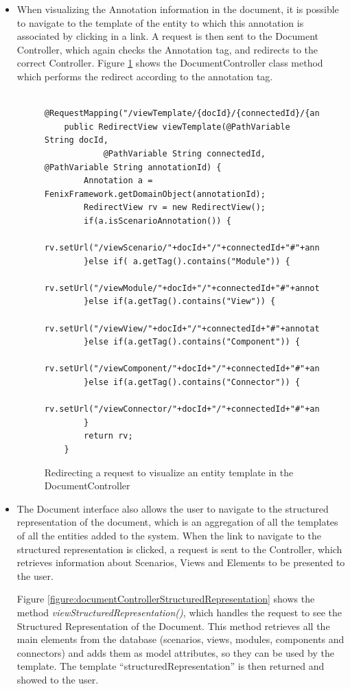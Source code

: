 \begin{itemize}
\item When visualizing the Annotation information in the document, it is possible to navigate to the template of the entity to which this annotation is associated by clicking in a link. A request is then sent to the Document Controller, which again checks the Annotation tag, and redirects to the correct Controller. Figure \ref{figure:documentControllerViewTemplate} shows the DocumentController class method which performs the redirect according to the annotation tag.

\begin{figure}[h]
\lstset{style=customjava}
\begin{lstlisting}
	@RequestMapping("/viewTemplate/{docId}/{connectedId}/{annotationId}")
	public RedirectView viewTemplate(@PathVariable String docId,
			@PathVariable String connectedId, @PathVariable String annotationId) {
		Annotation a = FenixFramework.getDomainObject(annotationId);
		RedirectView rv = new RedirectView();
		if(a.isScenarioAnnotation()) {
			rv.setUrl("/viewScenario/"+docId+"/"+connectedId+"#"+annotationId);
		}else if( a.getTag().contains("Module")) {
			rv.setUrl("/viewModule/"+docId+"/"+connectedId+"#"+annotationId);
		}else if(a.getTag().contains("View")) {
			rv.setUrl("/viewView/"+docId+"/"+connectedId+"#"+annotationId);
		}else if(a.getTag().contains("Component")) {
			rv.setUrl("/viewComponent/"+docId+"/"+connectedId+"#"+annotationId);
		}else if(a.getTag().contains("Connector")) {
			rv.setUrl("/viewConnector/"+docId+"/"+connectedId+"#"+annotationId);
		}
		return rv;
	}	
\end{lstlisting}
\caption{Redirecting a request to visualize an entity template in the DocumentController}
\label{figure:documentControllerViewTemplate}
\end{figure}

\item The Document interface also allows the user to navigate to the structured representation of the document, which is an aggregation of all the templates of all the entities added to the system. When the link to navigate to the structured representation is clicked, a request is sent to the Controller, which retrieves information about Scenarios, Views and Elements to be presented to the user. 

Figure \ref{figure:documentControllerStructuredRepresentation} shows the method \textit{viewStructuredRepresentation()}, which handles the request to see the Structured Representation of the Document. This method retrieves all the main elements from the database (scenarios, views, modules, components and connectors) and adds them as model attributes, so they can be used by the template. The template ``structuredRepresentation'' is then returned and showed to the user.


\end{itemize}
